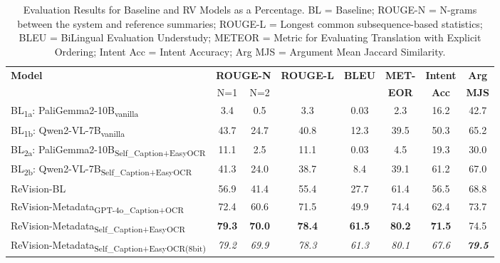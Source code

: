 \begin{table*}[t]
    \centering
    \footnotesize
    \begin{tabular}{lccccc|cc}
        \toprule
        \textbf{Model} & \multicolumn{2}{c}{\textbf{ROUGE-N}} & \textbf{ROUGE-L} & \textbf{BLEU} & \textbf{MET-} & \textbf{Intent} & \textbf{Arg} \\
                       & N=1              & N=2              &                  &               & \textbf{EOR}  & \textbf{Acc}   & \textbf{MJS} \\
        \midrule
        BL\textsubscript{1a}: PaliGemma2-10B\textsubscript{vanilla} & 3.4 & 0.5 & 3.3 & 0.03 & 2.3 & 16.2 & 42.7 \\
        BL\textsubscript{1b}: Qwen2-VL-7B\textsubscript{vanilla}   & 43.7 & 24.7 & 40.8 & 12.3 & 39.5 & 50.3 & 65.2 \\
        BL\textsubscript{2a}: PaliGemma2-10B\textsubscript{Self\_Caption+EasyOCR} & 11.1 & 2.5 & 11.1 & 0.03 & 4.5 & 19.3 & 30.0 \\
        BL\textsubscript{2b}: Qwen2-VL-7B\textsubscript{Self\_Caption+EasyOCR} & 41.3 & 24.0 & 38.7 & 8.4 & 39.1 & 61.2 & 67.0 \\
        \hline
        ReVision-BL                         & 56.9 & 41.4 & 55.4 & 27.7 & 61.4 & 56.5 & 68.8 \\
        ReVision-Metadata\textsubscript{GPT-4o\_Caption+OCR} & 72.4 & 60.6 & 71.5 & 49.9 & 74.4 & 62.4 & 73.7 \\
        ReVision-Metadata\textsubscript{Self\_Caption+EasyOCR}     & \textbf{79.3} & \textbf{70.0} & \textbf{78.4} & \textbf{61.5} & \textbf{80.2} & \textbf{71.5} & 74.5 \\
        ReVision-Metadata\textsubscript{Self\_Caption+EasyOCR(8bit)} & \textit{79.2} & \textit{69.9} & \textit{78.3} & \textit{61.3} & \textit{80.1} & \textit{67.6} & \textbf{\textit{79.5}} \\
        \bottomrule
    \end{tabular}
    \caption{Evaluation Results for Baseline and RV Models as a Percentage. BL = Baseline; ROUGE-N = N-grams between the system and reference summaries; ROUGE-L = Longest common subsequence-based statistics; BLEU = BiLingual Evaluation Understudy; METEOR = Metric for Evaluating Translation with Explicit Ordering; Intent Acc = Intent Accuracy; Arg MJS = Argument Mean Jaccard Similarity.}

    \label{tab:evaluation_results}
\end{table*}



